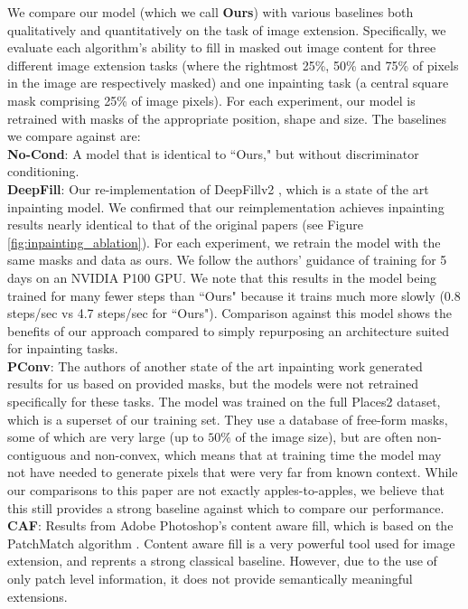 We compare our model (which we call \textbf{Ours}) with various baselines both qualitatively and quantitatively on the task of image extension. Specifically, we evaluate each algorithm's ability to fill in masked out image content for three different image extension tasks (where the rightmost 25\%, 50\% and 75\% of pixels in the image are respectively masked) and one inpainting task (a central square mask comprising 25\% of image pixels). For each experiment, our model is retrained with masks of the appropriate position, shape and size. The baselines we compare against are:\\
    \noindent\textbf{No-Cond}: A model that is identical to ``Ours," but without discriminator conditioning.\\
    \noindent\textbf{DeepFill}: Our re-implementation of  DeepFillv2 \cite{yu2018free}, which is a state of the art inpainting model. We confirmed that our reimplementation achieves inpainting results nearly identical to that of the original papers (see Figure \ref{fig:inpainting_ablation}). For each experiment, we retrain the model with the same masks and data as ours. We follow the authors' guidance of training for 5 days on an NVIDIA P100 GPU. We note that this results in the model being trained for many fewer steps than ``Ours" because it trains much more slowly (0.8 steps/sec vs 4.7 steps/sec for ``Ours"). Comparison against this model shows the benefits of our approach compared to simply repurposing an architecture suited for inpainting tasks.\\
    \noindent\textbf{PConv}: The authors of another state of the art inpainting work \cite{liu2018partialinpainting} generated results for us based on provided masks, but the models were not retrained specifically for these tasks. The model was trained on the full Places2 dataset, which is a superset of our training set. They use a database of free-form masks, some of which are very large (up to $50\%$ of the image size), but are often non-contiguous and non-convex, which means that at training time the model may not have needed to generate pixels that were very far from known context. While our comparisons to this paper are not exactly apples-to-apples, we believe that this still provides a strong baseline against which to compare our performance.\\
    \noindent\textbf{CAF}: Results from Adobe Photoshop's content aware fill, which is based on the PatchMatch  algorithm \cite{barnes2009patchmatch}. Content aware fill is a very powerful tool used for image extension, and reprents a strong classical baseline. However, due to the use of only patch level information, it does not provide semantically meaningful extensions.\\   
    
